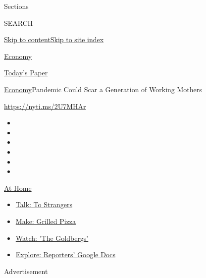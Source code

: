 Sections

SEARCH

\protect\hyperlink{site-content}{Skip to
content}\protect\hyperlink{site-index}{Skip to site index}

\href{https://www.nytimes.com/section/business/economy}{Economy}

\href{https://myaccount.nytimes.com/auth/login?response_type=cookie\&client_id=vi}{}

\href{https://www.nytimes.com/section/todayspaper}{Today's Paper}

\href{/section/business/economy}{Economy}\textbar{}Pandemic Could Scar a
Generation of Working Mothers

\url{https://nyti.ms/2U7MHAr}

\begin{itemize}
\item
\item
\item
\item
\item
\item
\end{itemize}

\href{https://www.nytimes.com/spotlight/at-home?action=click\&pgtype=Article\&state=default\&region=TOP_BANNER\&context=at_home_menu}{At
Home}

\begin{itemize}
\tightlist
\item
  \href{https://www.nytimes.com/2020/08/03/well/family/the-benefits-of-talking-to-strangers.html?action=click\&pgtype=Article\&state=default\&region=TOP_BANNER\&context=at_home_menu}{Talk:
  To Strangers}
\item
  \href{https://www.nytimes.com/2020/08/01/at-home/coronavirus-make-pizza-on-a-grill.html?action=click\&pgtype=Article\&state=default\&region=TOP_BANNER\&context=at_home_menu}{Make:
  Grilled Pizza}
\item
  \href{https://www.nytimes.com/2020/07/31/arts/television/goldbergs-abc-stream.html?action=click\&pgtype=Article\&state=default\&region=TOP_BANNER\&context=at_home_menu}{Watch:
  'The Goldbergs'}
\item
  \href{https://www.nytimes.com/interactive/2020/at-home/even-more-reporters-editors-diaries-lists-recommendations.html?action=click\&pgtype=Article\&state=default\&region=TOP_BANNER\&context=at_home_menu}{Explore:
  Reporters' Google Docs}
\end{itemize}

Advertisement


